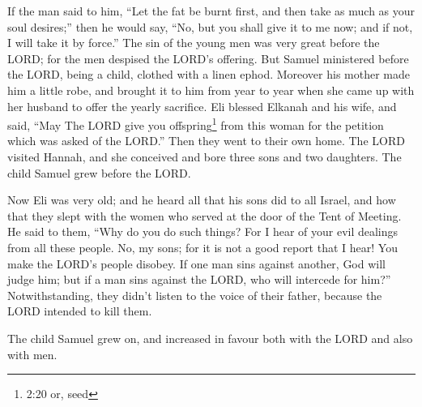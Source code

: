  If the man said to him, ``Let the fat be burnt first, and
then take as much as your soul desires;'' then he would say, ``No, but
you shall give it to me now; and if not, I will take it by force.''
 The sin of the young men was very great before the LORD;
for the men despised the LORD's offering.  But Samuel
ministered before the LORD, being a child, clothed with a linen ephod.
 Moreover his mother made him a little robe, and brought it
to him from year to year when she came up with her husband to offer the
yearly sacrifice.  Eli blessed Elkanah and his wife, and
said, ``May The LORD give you offspring\footnote{2:20 or, seed} from
this woman for the petition which was asked of the LORD.'' Then they
went to their own home.  The LORD visited Hannah, and she
conceived and bore three sons and two daughters. The child Samuel grew
before the LORD.

 Now Eli was very old; and he heard all that his sons did
to all Israel, and how that they slept with the women who served at the
door of the Tent of Meeting.  He said to them, ``Why do you
do such things? For I hear of your evil dealings from all these people.
 No, my sons; for it is not a good report that I hear! You
make the LORD's people disobey.  If one man sins against
another, God will judge him; but if a man sins against the LORD, who
will intercede for him?'' Notwithstanding, they didn't listen to the
voice of their father, because the LORD intended to kill them.

 The child Samuel grew on, and increased in favour both
with the LORD and also with men.

